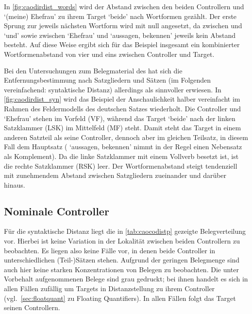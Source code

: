In \cref{fig:caodirdist_words} wird der Abstand zwischen den beiden Controllern
 und  `(meine) Ehefrau' zu ihrem Target
 `beide' nach Wortformen gezählt. Der erste Sprung zur jeweils
nächsten Wortform wird mit null angesetzt, da zwischen  und
 `und' sowie zwischen  `Ehefrau' und
 `aussagen, bekennen' jeweils kein Abstand besteht. Auf
diese Weise ergibt sich für das Beispiel insgesamt ein kombinierter Wortformenabstand von vier und
eins zwischen Controller und Target.

Bei den Untersuchungen zum Belegmaterial des \CAO{} hat sich die
Entfernungsbestimmung nach Satzgliedern und Sätzen (im Folgenden vereinfachend:
syntaktische Distanz) allerdings als sinnvoller erwiesen. In
\cref{fig:caodirdist_syn} wird das Beispiel der Anschaulichkeit halber
vereinfacht im Rahmen des Feldermodells des deutschen Satzes
\autocites{drach1963}{woellstein2010}[vgl.\ auch][43--51]{mueller2020}
wiederholt. Die Controller  und  `Ehefrau'
stehen im Vorfeld (VF), während das Target  `beide' nach der
linken Satzklammer (LSK) im Mittelfeld (MF) steht. Damit steht das Target in
einem anderen Satzteil als seine Controller, dennoch aber im gleichen Teilsatz,
in diesem Fall dem Hauptsatz ( `aussagen, bekennen' nimmt
in der Regel einen Nebensatz als Komplement). Da die linke Satzklammer mit
einem Vollverb besetzt ist, ist die rechte Satzklammer (RSK) leer. Der
Wortformenabstand steigt tendenziell mit zunehmendem Abstand zwischen
Satzgliedern zueinander und darüber hinaus.

\subsection{Nominale Controller}
\label{subsec:caodistnomctrl}

Für die syntaktische Distanz liegt die in \cref{tab:caocodistp} gezeigte
Belegverteilung vor. Hierbei ist keine Variation in der Lokalität zwischen
beiden Controllern zu beobachten. Es liegen also keine Fälle vor, in denen
beide Controller in unterschiedlichen (Teil-)Sätzen stehen. Aufgrund der
geringen Belegmenge sind auch hier keine starken Konzentrationen von Belegen zu
beobachten. Die unter Vorbehalt aufgenommenen Belege sind grau gedruckt; bei
ihnen handelt es sich in allen Fällen zufällig um Targets in Distanzstellung zu
ihrem Controller (vgl.~\cref{sec:floatquant} zu Floating Quantifiers). In allen
Fällen folgt das Target seinen Controllern.

